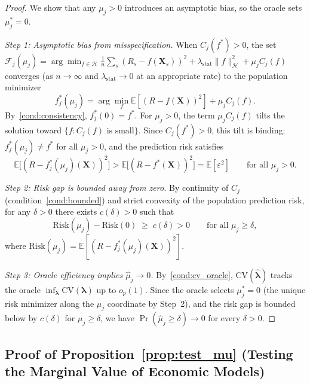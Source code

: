 \begin{proof}
We show that any $\mu_j > 0$ introduces an asymptotic bias, so the
oracle sets $\mu_j^* = 0$.

\emph{Step 1: Asymptotic bias from misspecification.}
When $C_j(f^*) > 0$, the set
$\mathcal{F}_j(\mu_j) = \arg\min_{f \in \mathcal{H}}
\frac{1}{n}\sum_s (R_s - f(\mathbf{X}_s))^2
+ \lambda_{\mathrm{stat}}\|f\|_{\mathcal{H}}^2 + \mu_j C_j(f)$
converges (as $n \to \infty$ and $\lambda_{\mathrm{stat}} \to 0$ at an
appropriate rate) to the population minimizer
\[
f_j^*(\mu_j) = \arg\min_{f} \mathbb{E}[(R - f(\mathbf{X}))^2] + \mu_j C_j(f).
\]
By~\ref{cond:consistency}, $f_j^*(0) = f^*$.
For $\mu_j > 0$, the term $\mu_j C_j(f)$ tilts the solution toward
$\{f : C_j(f) \text{ is small}\}$.
Since $C_j(f^*) > 0$, this tilt is binding: $f_j^*(\mu_j) \neq f^*$
for all $\mu_j > 0$, and the prediction risk satisfies
\[
\mathbb{E}\bigl[(R - f_j^*(\mu_j)(\mathbf{X}))^2\bigr]
> \mathbb{E}\bigl[(R - f^*(\mathbf{X}))^2\bigr]
= \mathbb{E}[\varepsilon^2]
\qquad \text{for all } \mu_j > 0.
\]

\emph{Step 2: Risk gap is bounded away from zero.}
By continuity of $C_j$ (condition~\ref{cond:bounded}) and strict
convexity of the population prediction risk,
for any $\delta > 0$ there exists $c(\delta) > 0$ such that
\[
\mathrm{Risk}(\mu_j) - \mathrm{Risk}(0)
\;\geq\; c(\delta) > 0
\qquad \text{for all } \mu_j \geq \delta,
\]
where $\mathrm{Risk}(\mu_j) = \mathbb{E}[(R - f_j^*(\mu_j)(\mathbf{X}))^2]$.

\emph{Step 3: Oracle efficiency implies $\hat{\mu}_j \to 0$.}
By~\ref{cond:cv_oracle}, $\mathrm{CV}(\hat{\boldsymbol{\lambda}})$
tracks the oracle $\inf_{\boldsymbol{\lambda}} \mathrm{CV}(\boldsymbol{\lambda})$
up to $o_p(1)$.  Since the oracle selects $\mu_j^* = 0$
(the unique risk minimizer along the $\mu_j$ coordinate by Step~2),
and the risk gap is bounded below by $c(\delta)$ for $\mu_j \geq \delta$,
we have $\Pr(\hat{\mu}_j \geq \delta) \to 0$ for every $\delta > 0$.
\end{proof}

\subsection{Proof of Proposition~\ref{prop:test_mu} (Testing the Marginal Value of Economic Models)}

